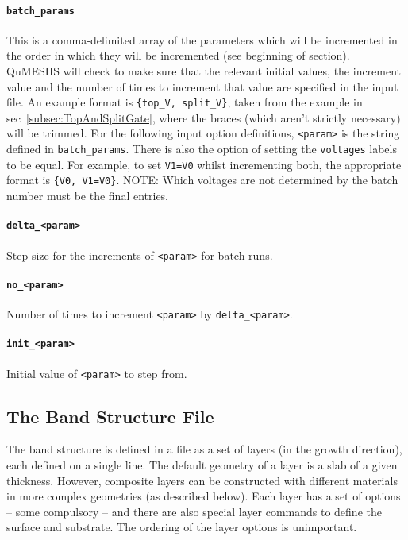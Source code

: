 \documentclass[12pt]{article}
\begin{document}
\paragraph{\texttt{batch\_params}}
This is a comma-delimited array of the parameters which will be incremented in the
order in which they will be incremented (see beginning of section).  QuMESHS will
check to make sure that the relevant initial values, the increment value and the
number of times to increment that value are specified in the input file.  An example
format is \texttt{\{top\_V, split\_V\}}, taken from the example in
sec~\ref{subsec:TopAndSplitGate}, where the braces (which aren't strictly necessary)
will be trimmed.  For the following input option definitions, \texttt{<param>} is the
string defined in \texttt{batch\_params}.  There is also the option of setting the
\texttt{voltages} labels to be equal.  For example, to set \texttt{V1=V0} whilst
incrementing both, the appropriate format is \texttt{\{V0, V1=V0\}}.  {\color{red} NOTE:}
Which voltages are not determined by the batch number must be the final entries.

\paragraph{\texttt{delta\_<param>}}
Step size for the increments of \texttt{<param>} for batch runs.

\paragraph{\texttt{no\_<param>}}
Number of times to increment \texttt{<param>} by \texttt{delta\_<param>}.

\paragraph{\texttt{init\_<param>}}
Initial value of \texttt{<param>} to step from.


\subsection{The Band Structure File}
\label{subsec:BandStructureFile}

The band structure is defined in a file as a set of layers (in the growth direction), each
defined on a single line.  The default geometry of a layer is a slab of a given thickness.
However, composite layers can be constructed with different materials in more complex
geometries (as described below).  Each layer has a set of options -- some compulsory --
and there are also special layer commands to define the surface and substrate.  The
ordering of the layer options is unimportant.
\end{document}
